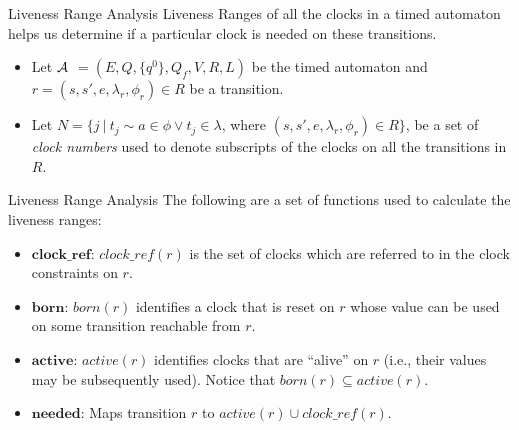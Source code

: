 \documentclass[10pt]{beamer}
\theoremstyle{plain}
\theoremstyle{definition}
\newcommand*{\Var}[1]{\ensuremath{\mathit{#1}}}
\newcommand*{\Active}{\Var{active}}
\newcommand*{\Born}{\Var{born}}
\begin{document}
\begin{frame}{Liveness Range Analysis}
Liveness Ranges of all the clocks in a timed automaton helps us determine if a particular clock is needed on these transitions.
\begin{itemize}
	\item Let $\cal A$ $= (E, Q, \{q^0\}, Q_f, V, R, L)$ be the timed automaton and $r = (s, s', e, \lambda_r, \phi_r) \in R$ be a transition.
	\item Let $N = \{j~|~t_j\sim a \in \phi \vee t_j \in \lambda$, where $(s, s', e, \lambda_r, \phi_r) \in R\}$, be a set of \emph{clock numbers} used to denote subscripts of the clocks on all the transitions in $R$.
\end{itemize}
\end{frame}

\begin{frame}{Liveness Range Analysis}
	The following are a set of functions used to calculate the liveness ranges:
	\begin{itemize}
		\item
		$\mathit{\textbf{clock\_ref}}$: $\mathit{clock\_ref(r)}$ is the set of clocks which are referred to in the clock constraints on $r$.
		\item
		$\textbf{born}$: $\Born(r)$ identifies a clock that is reset on $r$  whose value can be used on some transition	reachable from $r$.
		\item 
		$\textbf{active}$: $\Active(r)$ identifies clocks that are ``alive'' on $r$ (i.e., their  values may be subsequently used). Notice that $\Born(r)\subseteq \Active(r)$.
		\item
		$\textbf{needed}$: Maps transition $r$ to $\Active(r)\cup \mathit{clock\_ref(r)}$.
		
	\end{itemize}

\end{frame}
\end{document}
